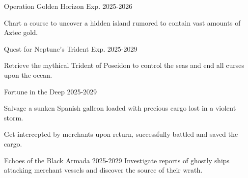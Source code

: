 


\begin{cventries}
\cventry
{Operation Golden Horizon} %
{}{}
{Exp. 2025-2026} %
{ %
\vspace{-4mm}
\begin{cvitemsnested}
    \item {Chart a course to uncover a hidden island rumored to contain vast amounts of Aztec gold.}
\end{cvitemsnested}
\vspace{-4mm}
}

\cventry
{Quest for Neptune’s Trident} %
{}{}
{Exp. 2025-2029} %
{ %
\vspace{-4mm}
\begin{cvitemsnested}
    \item {Retrieve the mythical Trident of Poseidon to control the seas and end all curses upon the ocean.}
\end{cvitemsnested}
\vspace{-4mm}
}

\cventry
{Fortune in the Deep} %
{}{}
{2025-2029} %
{ %
\vspace{-4mm}
\begin{cvitemsnested}
    \item {Salvage a sunken Spanish galleon loaded with precious cargo lost in a violent storm.}
    \item {Get intercepted by merchants upon return, successfully battled and saved the cargo. }
\end{cvitemsnested}
\vspace{-4mm}
}

\cventry
{Echoes of the Black Armada} %
{}{}
{2025-2029} %
{ %
Investigate reports of ghostly ships attacking merchant vessels and discover the source of their wrath.
}


\end{cventries}

